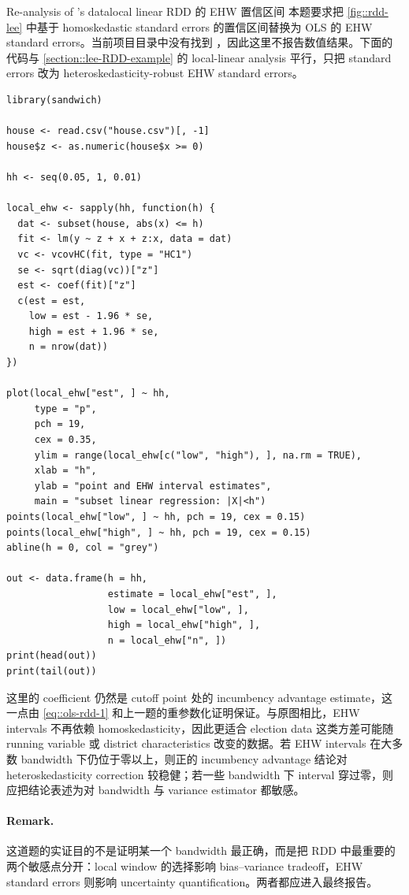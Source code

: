 \begin{exercisesolution}{Re-analysis of \citet{lee2008randomized}'s data}{local linear RDD 的 EHW 置信区间}
本题要求把 \cref{fig::rdd-lee} 中基于 homoskedastic standard errors 的置信区间替换为 OLS 的 EHW standard errors。当前项目目录中没有找到 ，因此这里不报告数值结果。下面的代码与 \cref{section::lee-RDD-example} 的 local-linear analysis 平行，只把 standard errors 改为 heteroskedasticity-robust EHW standard errors。

\begin{lstlisting}
library(sandwich)

house <- read.csv("house.csv")[, -1]
house$z <- as.numeric(house$x >= 0)

hh <- seq(0.05, 1, 0.01)

local_ehw <- sapply(hh, function(h) {
  dat <- subset(house, abs(x) <= h)
  fit <- lm(y ~ z + x + z:x, data = dat)
  vc <- vcovHC(fit, type = "HC1")
  se <- sqrt(diag(vc))["z"]
  est <- coef(fit)["z"]
  c(est = est,
    low = est - 1.96 * se,
    high = est + 1.96 * se,
    n = nrow(dat))
})

plot(local_ehw["est", ] ~ hh,
     type = "p",
     pch = 19,
     cex = 0.35,
     ylim = range(local_ehw[c("low", "high"), ], na.rm = TRUE),
     xlab = "h",
     ylab = "point and EHW interval estimates",
     main = "subset linear regression: |X|<h")
points(local_ehw["low", ] ~ hh, pch = 19, cex = 0.15)
points(local_ehw["high", ] ~ hh, pch = 19, cex = 0.15)
abline(h = 0, col = "grey")

out <- data.frame(h = hh,
                  estimate = local_ehw["est", ],
                  low = local_ehw["low", ],
                  high = local_ehw["high", ],
                  n = local_ehw["n", ])
print(head(out))
print(tail(out))
\end{lstlisting}

这里的 coefficient  仍然是 cutoff point 处的 incumbency advantage estimate，这一点由 \cref{eq::ols-rdd-1} 和上一题的重参数化证明保证。与原图相比，EHW intervals 不再依赖 homoskedasticity，因此更适合 election data 这类方差可能随 running variable 或 district characteristics 改变的数据。若 EHW intervals 在大多数 bandwidth 下仍位于零以上，则正的 incumbency advantage 结论对 heteroskedasticity correction 较稳健；若一些 bandwidth 下 interval 穿过零，则应把结论表述为对 bandwidth 与 variance estimator 都敏感。

\paragraph{Remark.}
这道题的实证目的不是证明某一个 bandwidth 最正确，而是把 RDD 中最重要的两个敏感点分开：local window 的选择影响 bias--variance tradeoff，EHW standard errors 则影响 uncertainty quantification。两者都应进入最终报告。
\end{exercisesolution}
